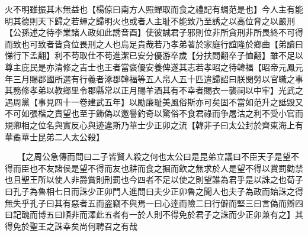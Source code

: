 火不明雖振其木無益也【楊倞曰南方人照蟬取而食之禮記有蜩范是也】今人主有能明其德則天下歸之若蟬之歸明火也或者人主耻不能致乃至誘之以高位脅之以嚴刑【公孫述之待李業諸人政如此誘音酉】使彼誠君子邪則位非所貪刑非所畏終不可得而致也可致者皆貪位畏刑之人也烏足貴哉若乃孝弟著於家庭行誼隆於鄉曲【弟讀曰悌行下孟翻】利不苟取仕不苟進潔已安分優游卒歲【分扶問翻卒子恤翻】雖不足以尊主庇民是亦清修之吉士也王者當褒優安養俾遂其志若孝昭之待韓福【昭帝元鳳元年三月賜郡國所選有行義者涿郡韓福等五人帛人五十匹遣歸詔曰朕閔勞以官職之事其務修孝弟以教鄉里令郡縣常以正月賜羊酒其有不幸者賜衣一襲祠以中牢】光武之遇周黨【事見四十一卷建武五年】以勵廉耻美風俗斯亦可矣固不當如范升之詆毁又不可如張楷之責望也至于飾偽以邀譽釣奇以驚俗不食君祿而争屠沽之利不受小官而規卿相之位名與實反心與迹違斯乃華士少正卯之流【韓非子曰太公封於齊東海上有華矞華士昆弟二人太公殺】

　　【之周公急傳而問曰二子皆賢人殺之何也太公曰是昆弟立議曰不臣天子是望不得而臣也不友諸侯是望不得而友也耕而食之掘而飲之無求於人是望不得以賞罰勸禁也且聖王所以使人非爵賞則刑罰也今四者不足以使之則望誰為君乎是以誅之也荀子曰孔子為魯相七日而誅少正卯門人進問曰夫少正卯魯之聞人也夫子為政而始誅之得無失乎孔子曰其有惡者五而盗竊不與焉一曰心逹而險二曰行僻而堅三曰言偽而辯四曰記醜而博五曰順非而澤此五者有一於人則不得免於君子之誅而少正卯兼有之】其得免於聖王之誅幸矣尚何聘召之有哉

